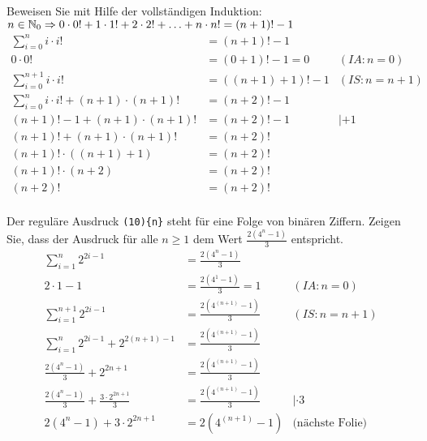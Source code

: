 \begin{card}
  Beweisen Sie mit Hilfe der vollständigen Induktion:\\
  $n \in \mathbb{N}_0 \Rightarrow 0 \cdot 0! + 1 \cdot 1! + 2 \cdot 2! + \ldots + n \cdot n! = (n+1)!-1$
  \hr
  \begin{align*}
    \sum\limits_{i=0}^{n} i \cdot i! &= (n+1)!-1 & \\
    0 \cdot 0! &= (0+1)!-1 = 0 & (IA: n=0) \\
    \sum\limits_{i=0}^{n+1} i \cdot i! &= ((n+1)+1)!-1 & (IS: n=n+1) \\
    \sum\limits_{i=0}^{n} i \cdot i! + (n+1) \cdot (n+1)! &= (n+2)!-1 & \\
    (n+1)! - 1 + (n+1) \cdot (n+1)! &= (n+2)!-1 & |+1 \\
    (n+1)! + (n+1) \cdot (n+1)! &= (n+2)! & \\
    (n+1)! \cdot ((n+1)+1) &= (n+2)! & \\
    (n+1)! \cdot (n+2) &= (n+2)! & \\
    (n+2)! &= (n+2)! & \\
  \end{align*}
\end{card}

\begin{card}
  Der reguläre Ausdruck \texttt{(10)\{n\}} steht für eine Folge von binären Ziffern. Zeigen Sie, dass der Ausdruck für alle
  $n \geq 1$ dem Wert $\frac{2(4^n - 1)}{3}$ entspricht.
  \hr
  \begin{align*}
    \sum\limits_{i=1}^{n} 2^{2i-1} &= \frac{2(4^n - 1)}{3} & \\
    2 \cdot 1 - 1 &= \frac{2(4^1 - 1)}{3} = 1 & (IA: n=0) \\
    \sum\limits_{i=1}^{n+1} 2^{2i-1} &= \frac{2(4^{(n+1)} - 1)}{3} & (IS: n=n+1) \\
    \sum\limits_{i=1}^{n} 2^{2i-1} + 2^{2(n+1) - 1} &= \frac{2(4^{(n+1)} - 1)}{3} & \\
    \frac{2(4^{n} - 1)}{3} + 2^{2n+1} &= \frac{2(4^{(n+1)} - 1)}{3} & \\
    \frac{2(4^{n} - 1)}{3} + \frac{3 \cdot 2^{2n+1}}{3} &= \frac{2(4^{(n+1)} - 1)}{3} & |\cdot 3 \\
    2(4^{n} - 1) + 3 \cdot 2^{2n+1} &= 2(4^{(n+1)} - 1) & \text{(nächste Folie)} \\
  \end{align*}
\end{card}

